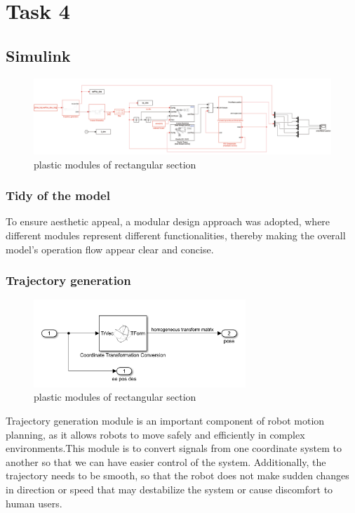 \section{Task 4}
\FloatBarrier %


\subsection{Simulink}

\begin{figure}[htbp]
    \centering
    \includegraphics[width=17cm]{./fig/sim.jpg}
    \caption{plastic modules of rectangular section  }
    \label{f1}
\end{figure}

\subsubsection*{Tidy of the model}
To ensure aesthetic appeal, a modular design approach was adopted, where different modules represent different functionalities, thereby making the overall model's operation flow appear clear and concise.

\subsubsection*{Trajectory generation}

\begin{figure}[htbp]
    \centering
    \includegraphics[width=8cm]{./fig/traj.png}
    \caption{plastic modules of rectangular section  }
    \label{f1}
\end{figure}

Trajectory generation module is an important component of robot motion planning, as it allows robots to move safely and efficiently in complex environments.This module is to convert signals from one coordinate system to another so that we can have easier control of the system. Additionally, the trajectory needs to be smooth, so that the robot does not make sudden changes in direction or speed that may destabilize the system or cause discomfort to human users.

